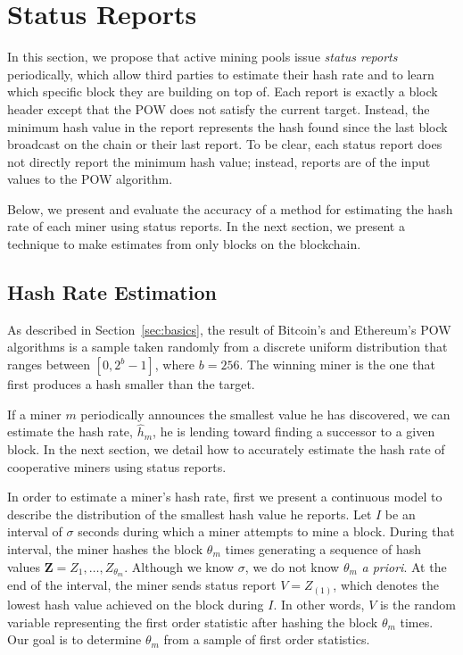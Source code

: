 \documentclass[10pt,sigconf]{acmart}
\newcommand{\para }[1]{\smallskip \noindent {\bf #1}}
\newcommand{\1}{{\em (i)}}
\newcommand{\2}{{\em (ii)}}
\newcommand{\3}{{\em (iii)}}
\newcommand{\4}{{\em (iv)}}
\newcommand{\5}{{\em (v)}}
\begin{document}
\section{Status Reports}
\label{sec:statusreports}
In this section, we propose that active mining pools issue {\em status reports}
periodically, which allow third parties to estimate their hash rate and to learn which specific block they are building on top of. Each report is exactly a block header except that the POW does not satisfy the current target. Instead, the minimum hash value in the report represents the hash found since the last block broadcast on
the chain or their last report. To be clear, each status report does not directly report the minimum hash value; instead, reports are of the input values to the POW algorithm. 

Below, we present and evaluate the accuracy of a method for estimating the hash
rate of each miner using status reports. In the next section, we present a technique to make estimates from only blocks on the blockchain.

\subsection{Hash Rate Estimation}
\label{sec:statusconsensus}
As described in Section~\ref{sec:basics}, the result of Bitcoin's and Ethereum's POW algorithms
is a sample taken
randomly from a discrete uniform distribution that ranges between
$[0,2^{b}-1]$, where $b=256$. The winning miner is the one that first produces a hash smaller than the target.

If a miner $m$ periodically announces the smallest value he has
discovered, we can estimate the hash rate, $\hat{h}_m$, he is lending
toward finding a successor to a given block. 
In the next section,
we detail how to accurately estimate the hash rate of cooperative
miners using status reports.

\para{Continuous model.} In order to estimate a miner's hash rate,
first we present a continuous model to describe the distribution of
the smallest hash value he reports. Let $I$  be an interval of
$\sigma$ seconds during which a miner attempts to mine a block. During
that interval, the miner hashes the block $\theta_m$ times generating
a sequence of hash values $\textbf{Z} = Z_1, \ldots,
Z_{\theta_m}$. Although we know $\sigma$, we do not know $\theta_m$
\emph{a priori}. At the end of the interval, the miner sends status
report $V = Z_{(1)}$, which denotes the lowest hash value achieved on the block
during $I$. In other words, $V$ is the random variable representing
the first order statistic after hashing the block $\theta_m$ times. Our goal
is to determine $\theta_m$ from a sample of first order statistics.
\end{document}
